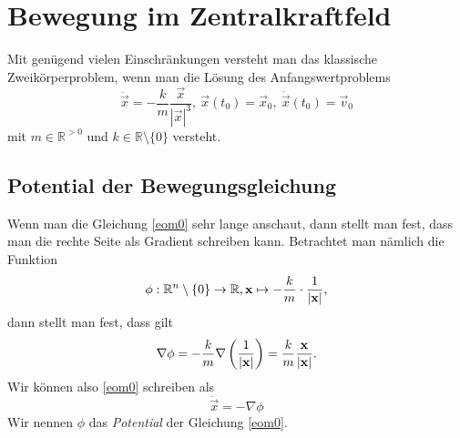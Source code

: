 \section{Bewegung im Zentralkraftfeld}
Mit genügend vielen Einschränkungen versteht man das klassische Zweikörperproblem, wenn man die Lösung des Anfangswertproblems
\begin{equation}\label{eom0}
\ddot{\vec{x}} = - \frac{k}{m} \frac{\vec{x}}{|\vec{x}|^3},~\vec{x}(t_0) = \vec{x}_0,~\dot{\vec{x}} (t_0) = \vec{v}_0
\end{equation}
mit $m\in \mathbb{R}^{>0}$ und $k\in \mathbb{R}\setminus\{0\}$ versteht.
\subsection{Potential der Bewegungsgleichung}
  Wenn man die Gleichung \eqref{eom0} sehr lange anschaut, dann stellt man fest, dass man die rechte Seite als Gradient schreiben kann. Betrachtet man nämlich die Funktion
  \[
  \phi:\mathbb{R}^n\setminus\{0\} \to \mathbb{R}, \mathbf{x} \mapsto - \frac{k}{m} \cdot \frac{1}{|\mathbf{x}|},
  \]
  dann stellt man fest, dass gilt
  \[
  \nabla \phi = -\frac{k}{m} \nabla \left(\frac{1}{|\mathbf{x}|}\right) = \frac{k}{m} \frac{\mathbf{x}}{|\mathbf{x}|}.
  \]
  Wir können also \eqref{eom0} schreiben als
  \begin{equation}\label{eompot}
    \ddot{\vec{x}} = -\nabla \phi
  \end{equation}
  Wir nennen $\phi$ das \emph{Potential} der Gleichung \eqref{eom0}.
